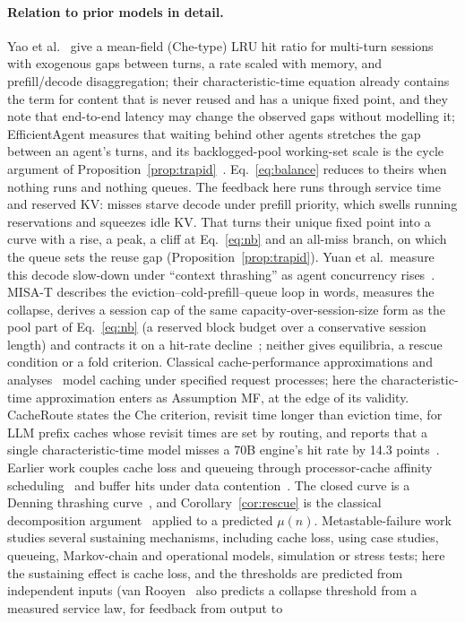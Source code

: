 \paragraph{Relation to prior models in detail.} Yao et al.~\citep{yao2026multiturn} give a mean-field (Che-type) LRU hit ratio for multi-turn sessions with exogenous gaps between turns, a rate scaled with memory, and prefill/decode disaggregation; their characteristic-time equation already contains the term for content that is never reused and has a unique fixed point, and they note that end-to-end latency may change the observed gaps without modelling it; EfficientAgent measures that waiting behind other agents stretches the gap between an agent's turns, and its backlogged-pool working-set scale is the cycle argument of Proposition~\ref{prop:trapid}~\citep{shao2026efficientagent}. Eq.~\eqref{eq:balance} reduces to theirs when nothing runs and nothing queues. The feedback here runs through service time and reserved KV: misses starve decode under prefill priority, which swells running reservations and squeezes idle KV. That turns their unique fixed point into a curve with a rise, a peak, a cliff at Eq.~\eqref{eq:nb} and an all-miss branch, on which the queue sets the reuse gap (Proposition~\ref{prop:trapid}). Yuan et al.\ measure this decode slow-down under ``context thrashing'' as agent concurrency rises~\citep{yuan2026agentic}. MISA-T describes the eviction--cold-prefill--queue loop in words, measures the collapse, derives a session cap of the same capacity-over-session-size form as the pool part of Eq.~\eqref{eq:nb} (a reserved block budget over a conservative session length) and contracts it on a hit-rate decline~\citep{hong2026misat}; neither gives equilibria, a rescue condition or a fold criterion. Classical cache-performance approximations and analyses~\citep{che2002hierarchical,fagin1977asymptotic,fricker2012versatile,martina2014unified,gast2015transient} model caching under specified request processes; here the characteristic-time approximation enters as Assumption MF, at the edge of its validity. CacheRoute states the Che criterion, revisit time longer than eviction time, for LLM prefix caches whose revisit times are set by routing, and reports that a single characteristic-time model misses a 70B engine's hit rate by 14.3 points~\citep{cheng2026cacheroute}. Earlier work couples cache loss and queueing through processor-cache affinity scheduling~\citep{squillante1993affinity} and buffer hits under data contention~\citep{dan1990skewed}. The closed curve is a Denning thrashing curve~\citep{denning1968thrashing}, and Corollary~\ref{cor:rescue} is the classical decomposition argument~\citep{courtois1975decomposability} applied to a predicted $\mu(n)$. Metastable-failure work~\citep{bronson2021metastable,isaacs2025analyzing,alvaro2025formal,habibi2024msf,farahbakhsh2025modeling} studies several sustaining mechanisms, including cache loss, using case studies, queueing, Markov-chain and operational models, simulation or stress tests; here the sustaining effect is cache loss, and the thresholds are predicted from independent inputs (van Rooyen~\citep{vanrooyen2026recoverability} also predicts a collapse threshold from a measured service law, for feedback from output to 